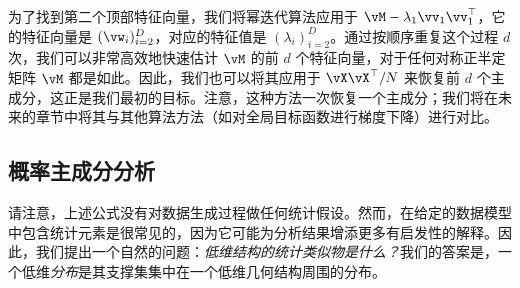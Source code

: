 \documentclass[../../book-main_zh.tex]{subfiles}
\begin{document}

为了找到第二个顶部特征向量，我们将幂迭代算法应用于 \(\vM - \lambda_{1}\vv_{1}\vv_{1}^{\top}\)，它的特征向量是 \((\vw_{i})_{i = 2}^{D}\)，对应的特征值是 \((\lambda_{i})_{i = 2}^{D}\)。通过按顺序重复这个过程 \(d\) 次，我们可以非常高效地快速估计 \(\vM\) 的前 \(d\) 个特征向量，对于任何对称正半定矩阵 \(\vM\) 都是如此。因此，我们也可以将其应用于 \(\vX\vX^{\top}/N\) 来恢复前 \(d\) 个主成分，这正是我们最初的目标。注意，这种方法一次恢复一个主成分；我们将在未来的章节中将其与其他算法方法（如对全局目标函数进行梯度下降）进行对比。





\subsection{概率主成分分析}\label{subsec:probabilistic PCA}

请注意，上述公式没有对数据生成过程做任何统计假设。然而，在给定的数据模型中包含统计元素是很常见的，因为它可能为分析结果增添更多有启发性的解释。因此，我们提出一个自然的问题：\textit{低维结构的统计类似物是什么？}我们的答案是，一个低维\textit{分布}是其支撑集集中在一个低维几何结构周围的分布。
\end{document}
